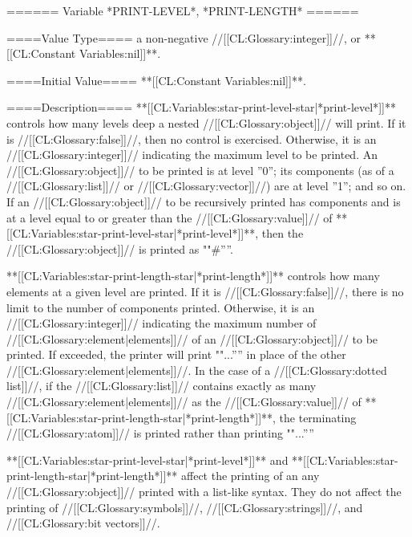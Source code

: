 ====== Variable *PRINT-LEVEL*, *PRINT-LENGTH* ======

====Value Type====
a non-negative //[[CL:Glossary:integer]]//, or **[[CL:Constant Variables:nil]]**.

====Initial Value====
**[[CL:Constant Variables:nil]]**.

====Description====
**[[CL:Variables:star-print-level-star|*print-level*]]** controls how many levels deep a nested //[[CL:Glossary:object]]// will print. If it is //[[CL:Glossary:false]]//, then no control is exercised. Otherwise, it is an //[[CL:Glossary:integer]]// indicating the maximum level to be printed. An //[[CL:Glossary:object]]// to be printed is at level ''0''; its components (as of a //[[CL:Glossary:list]]// or //[[CL:Glossary:vector]]//) are at level ''1''; and so on. If an //[[CL:Glossary:object]]// to be recursively printed has components and is at a level equal to or greater than the //[[CL:Glossary:value]]// of **[[CL:Variables:star-print-level-star|*print-level*]]**, then the //[[CL:Glossary:object]]// is printed as ""#''''.

**[[CL:Variables:star-print-length-star|*print-length*]]** controls how many elements at a given level are printed. If it is //[[CL:Glossary:false]]//, there is no limit to the number of components printed. Otherwise, it is an //[[CL:Glossary:integer]]// indicating the maximum number of //[[CL:Glossary:element|elements]]// of an //[[CL:Glossary:object]]// to be printed. If exceeded, the printer will print ""...'''' in place of the other //[[CL:Glossary:element|elements]]//. In the case of a //[[CL:Glossary:dotted list]]//, if the //[[CL:Glossary:list]]// contains exactly as many //[[CL:Glossary:element|elements]]// as the //[[CL:Glossary:value]]// of **[[CL:Variables:star-print-length-star|*print-length*]]**, the terminating //[[CL:Glossary:atom]]// is printed rather than printing ""...''''

**[[CL:Variables:star-print-level-star|*print-level*]]** and **[[CL:Variables:star-print-length-star|*print-length*]]** affect the printing of an any //[[CL:Glossary:object]]// printed with a list-like syntax. They do not affect the printing of //[[CL:Glossary:symbols]]//, //[[CL:Glossary:strings]]//, and //[[CL:Glossary:bit vectors]]//.

